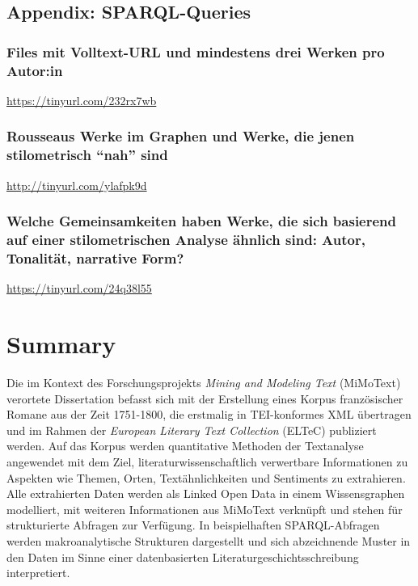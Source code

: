 \documentclass[
  12pt,
  letterpaper,
  DIV=11,
  numbers=noendperiod]{scrreprt}
\begin{document}
\section{Appendix: SPARQL-Queries}\label{appendix-sparql-queries}

\subsection{Files mit Volltext-URL und mindestens drei Werken pro
Autor:in}\label{files-mit-volltext-url-und-mindestens-drei-werken-pro-autorin}

\url{https://tinyurl.com/232rx7wb}

\subsection{Rousseaus Werke im Graphen und Werke, die jenen
stilometrisch ``nah''
sind}\label{rousseaus-werke-im-graphen-und-werke-die-jenen-stilometrisch-nah-sind-1}

\url{http://tinyurl.com/ylafpk9d}

\subsection{Welche Gemeinsamkeiten haben Werke, die sich basierend auf
einer stilometrischen Analyse ähnlich sind: Autor, Tonalität, narrative
Form?}\label{welche-gemeinsamkeiten-haben-werke-die-sich-basierend-auf-einer-stilometrischen-analyse-uxe4hnlich-sind-autor-tonalituxe4t-narrative-form-1}

\url{https://tinyurl.com/24q38l55}


\chapter{Summary}\label{summary}

Die im Kontext des Forschungsprojekts \emph{Mining and Modeling Text}
(MiMoText) verortete Dissertation befasst sich mit der Erstellung eines
Korpus französischer Romane aus der Zeit 1751-1800, die erstmalig in
TEI-konformes XML übertragen und im Rahmen der \emph{European Literary
Text Collection} (ELTeC) publiziert werden. Auf das Korpus werden
quantitative Methoden der Textanalyse angewendet mit dem Ziel,
literaturwissenschaftlich verwertbare Informationen zu Aspekten wie
Themen, Orten, Textähnlichkeiten und Sentiments zu extrahieren. Alle
extrahierten Daten werden als Linked Open Data in einem Wissensgraphen
modelliert, mit weiteren Informationen aus MiMoText verknüpft und stehen
für strukturierte Abfragen zur Verfügung. In beispielhaften
SPARQL-Abfragen werden makroanalytische Strukturen dargestellt und sich
abzeichnende Muster in den Daten im Sinne einer datenbasierten
Literaturgeschichtsschreibung interpretiert.
\end{document}
